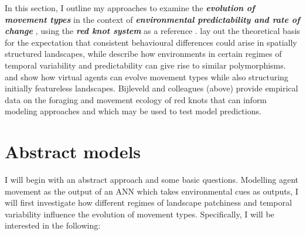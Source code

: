 In this section, I outline my approaches to examine the \textbf{\emph{evolution of movement types}} \citep[\emph{sensu}][]{wolf2010, getz2015} in the context of \textbf{\emph{environmental predictability and rate of change}} \citep[as in][]{botero2015}, using the \textbf{\emph{red knot system}} as a reference \citep{bijleveld2012a, bijleveld2014, bijleveld2015c, bijleveld2015b, oudman2016, oudman2018}. \citet{wolf2010} lay out the theoretical basis for the expectation that consistent behavioural differences could arise in spatially structured landscapes, while \citet{botero2015} describe how environments in certain regimes of temporal variability and predictability can give rise to similar polymorphisms. \citet{getz2015} and \citet{netz2017} show how virtual agents can evolve movement types while also structuring initially featureless landscapes. Bijleveld and colleagues (above) provide empirical data on the foraging and movement ecology of red knots that can inform modeling approaches and which may be used to test model predictions.

\section{Abstract models}

I will begin with an abstract approach and some basic questions. Modelling agent movement as the output of an ANN which takes environmental cues as outputs, I will first investigate how different regimes of landscape patchiness and temporal variability influence the evolution of movement types. Specifically, I will be interested in the following:

